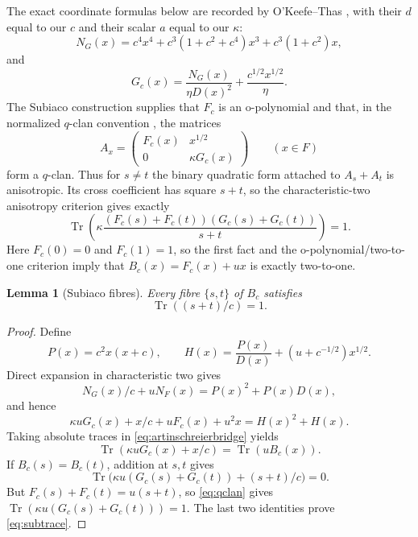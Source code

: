 \documentclass[11pt]{article}
\newtheorem{lemma}[theorem]{Lemma}
\theoremstyle{definition}\newtheorem{definition}[theorem]{Definition}
\theoremstyle{remark}\newtheorem{remark}[theorem]{Remark}
\DeclareMathOperator{\Tr}{Tr}
\begin{document}
The exact coordinate formulas below are recorded by O'Keefe--Thas
\cite[pp.~178--179]{okeefe-thas}, with their \(d\) equal to our \(c\) and their scalar
\(a\) equal to our \(\kappa\):
\[
 N_G(x)=c^4x^4+c^3(1+c^2+c^4)x^3+c^3(1+c^2)x,
\]
and
\begin{equation}
 G_c(x)=\frac{N_G(x)}{\eta D(x)^2}
       +\frac{c^{1/2}x^{1/2}}{\eta}.
 \label{eq:subiacocompanion}
\end{equation}
The Subiaco construction \cite{flocks-ovals} supplies that \(F_c\) is an
o-polynomial and that, in the normalized \(q\)-clan convention
\cite[Eq.~(19)]{bader-qclan}, the matrices
\[
 A_x=\begin{pmatrix}F_c(x)&x^{1/2}\\0&\kappa G_c(x)\end{pmatrix}
 \qquad(x\in F)
\]
form a \(q\)-clan.  Thus for \(s\ne t\) the binary quadratic form attached
to \(A_s+A_t\) is anisotropic.  Its cross coefficient has square \(s+t\),
so the characteristic-two anisotropy criterion gives exactly
\begin{equation}
 \Tr\left(
   \kappa\frac{(F_c(s)+F_c(t))(G_c(s)+G_c(t))}{s+t}
 \right)=1.
 \label{eq:qclan}
\end{equation}
Here \(F_c(0)=0\) and \(F_c(1)=1\), so the first fact and the
o-polynomial/two-to-one criterion \cite[Theorem~2.2]{kolsch} imply that
\(B_c(x)=F_c(x)+ux\) is exactly two-to-one.

\begin{lemma}[Subiaco fibres]
\label{lem:subfibres}
Every fibre \(\{s,t\}\) of \(B_c\) satisfies
\begin{equation}
 \Tr((s+t)/c)=1.
 \label{eq:subtrace}
\end{equation}
\end{lemma}
\begin{proof}
Define
\[
 P(x)=c^2x(x+c),\qquad
 H(x)=\frac{P(x)}{D(x)}+(u+c^{-1/2})x^{1/2}.
\]
Direct expansion in characteristic two gives
\[
 N_G(x)/c+uN_F(x)=P(x)^2+P(x)D(x),
\]
and hence
\begin{equation}
 \kappa uG_c(x)+x/c+uF_c(x)+u^2x=H(x)^2+H(x).
 \label{eq:artinschreierbridge}
\end{equation}
Taking absolute traces in \eqref{eq:artinschreierbridge} yields
\[
 \Tr(\kappa uG_c(x)+x/c)=\Tr(uB_c(x)).
\]
If \(B_c(s)=B_c(t)\), addition at \(s,t\) gives
\[
 \Tr\bigl(\kappa u(G_c(s)+G_c(t))+(s+t)/c\bigr)=0.
\]
But \(F_c(s)+F_c(t)=u(s+t)\), so \eqref{eq:qclan} gives
\(\Tr(\kappa u(G_c(s)+G_c(t)))=1\).  The last two identities prove
\eqref{eq:subtrace}.
\end{proof}
\end{document}
